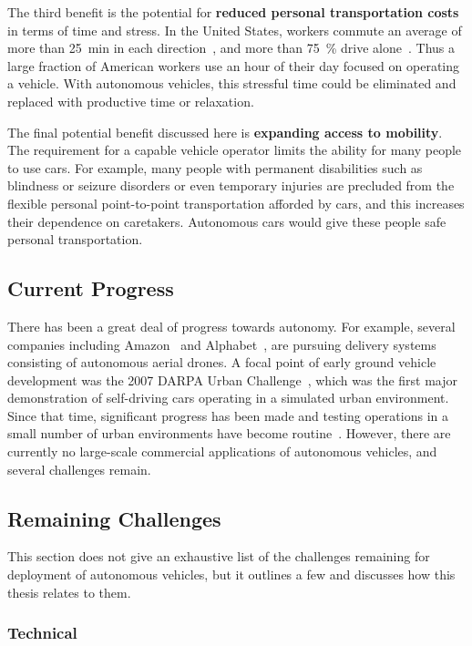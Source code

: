 The third benefit is the potential for \textbf{reduced personal transportation costs} in terms of time and stress.
In the United States, workers commute an average of more than \SI{25}{\minute} in each direction~\cite{census2016travel}, and more than \SI{75}{\percent} drive alone~\cite{mckenzie2015who}.
Thus a large fraction of American workers use an hour of their day focused on operating a vehicle.
With autonomous vehicles, this stressful time could be eliminated and replaced with productive time or relaxation.

The final potential benefit discussed here is \textbf{expanding access to mobility}.
The requirement for a capable vehicle operator limits the ability for many people to use cars.
For example, many people with permanent disabilities such as blindness or seizure disorders or even temporary injuries are precluded from the flexible personal point-to-point transportation afforded by cars, and this increases their dependence on caretakers.
Autonomous cars would give these people safe personal transportation.

\subsection{Current Progress}

There has been a great deal of progress towards autonomy.
For example, several companies including Amazon~\cite{shaban2018amazon} and Alphabet~\cite{sandoval2018alphabet}, are pursuing delivery systems consisting of autonomous aerial drones.
A focal point of early ground vehicle development was the 2007 DARPA Urban Challenge~\cite{MB-KI-SS:10}, which was the first major demonstration of self-driving cars operating in a simulated urban environment.
Since that time, significant progress has been made and testing operations in a small number of urban environments have become routine~\cite{dolgov2016google}.
However, there are currently no large-scale commercial applications of autonomous vehicles, and several challenges remain.

\subsection{Remaining Challenges}

This section does not give an exhaustive list of the challenges remaining for deployment of autonomous vehicles, but it outlines a few and discusses how this thesis relates to them.

\subsubsection{Technical}

